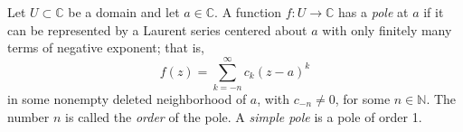 \documentclass[12pt]{article}
\begin{document}
Let $U \subset \mathbb{C}$ be a domain and let $a \in \mathbb{C}$. A function $f\colon U \to \mathbb{C}$ has a \emph{pole} at $a$ if it can be represented by a Laurent series centered about $a$ with only finitely many terms of negative exponent; that is,
\[
f(z) = \sum_{k=-n}^\infty c_k (z-a)^k
\]
in some nonempty deleted neighborhood of $a$, with $c_{-n} \neq 0$, for some $n \in \mathbb{N}$. The number $n$ is called the \emph{order} of the pole. A \emph{simple pole} is a pole of order 1.
\end{document}
